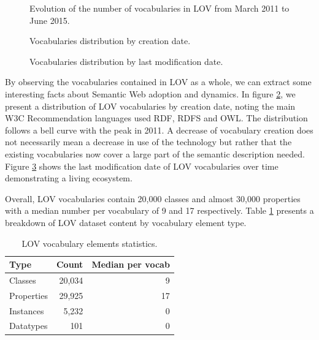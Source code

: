 \documentclass{iosart2c}
\begin{document}
\begin{figure}[htb]
   
   \caption{\label{fig:evolLOV} Evolution of the number of vocabularies in LOV from March 2011 to June 2015.}
\end{figure}

\begin{figure}[htb]

\caption{\label{fig:creaevol} Vocabularies distribution by creation date.}
\end{figure}

\begin{figure}[htb]

\caption{\label{fig:modifevol} Vocabularies distribution by last modification date.}
\end{figure}

By observing the vocabularies contained in LOV as a whole, we can extract some interesting facts about Semantic Web adoption and dynamics. In figure \ref{fig:creaevol}, we present a distribution of LOV vocabularies by creation date, noting the main W3C Recommendation languages used RDF, RDFS and OWL. The distribution follows a bell curve with the peak in 2011. A decrease of vocabulary creation does not necessarily mean a decrease in use of the technology but rather that the existing vocabularies now cover a large part of the semantic description needed. Figure \ref{fig:modifevol} shows the last modification date of LOV vocabularies over time demonstrating a living ecosystem. 


Overall, LOV vocabularies contain 20,000 classes and almost 30,000 properties with a median number per vocabulary of 9 and 17 respectively. Table \ref{tab:elements} presents a breakdown of LOV dataset content by vocabulary element type. 

\begin{table}[h!tb]
\caption{LOV vocabulary elements statistics.}
\begin{tabular}{lrr}
\hline
\textbf{Type} & \textbf{Count} &  \textbf{Median per vocab} \\ \hline
Classes & 20,034 & 9 \\
Properties & 29,925 & 17 \\
Instances & 5,232 & 0 \\
Datatypes & 101 & 0 \\
\hline  
\end{tabular}
\label{tab:elements}
\end{table}
\end{document}
